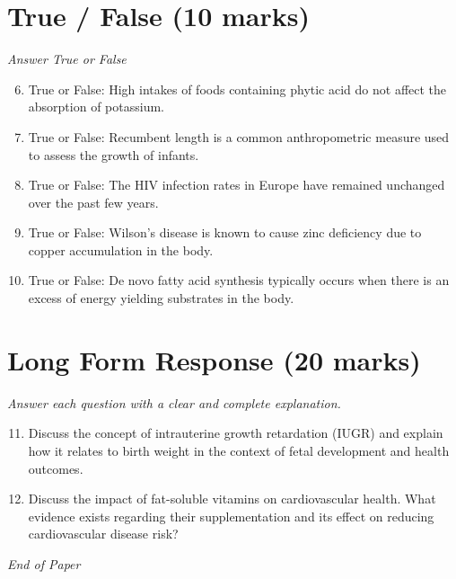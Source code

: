 \documentclass[12pt]{article}
\begin{document}
\section*{True / False (10 marks)}
\textit{Answer True or False}
\begin{enumerate}[label=\arabic*.]
\setcounter{enumi}{5}
\item True or False: High intakes of foods containing phytic acid do not affect the absorption of potassium.
\item True or False: Recumbent length is a common anthropometric measure used to assess the growth of infants.
\item True or False: The HIV infection rates in Europe have remained unchanged over the past few years.
\item True or False: Wilson's disease is known to cause zinc deficiency due to copper accumulation in the body.
\item True or False: De novo fatty acid synthesis typically occurs when there is an excess of energy yielding substrates in the body.
\end{enumerate}

\section*{Long Form Response (20 marks)}
\textit{Answer each question with a clear and complete explanation.}
\begin{enumerate}[label=\arabic*.]
\setcounter{enumi}{10}
\item Discuss the concept of intrauterine growth retardation (IUGR) and explain how it relates to birth weight in the context of fetal development and health outcomes.
\item Discuss the impact of fat-soluble vitamins on cardiovascular health. What evidence exists regarding their supplementation and its effect on reducing cardiovascular disease risk?
\end{enumerate}

\vfill
\noindent\textit{End of Paper}
\end{document}
